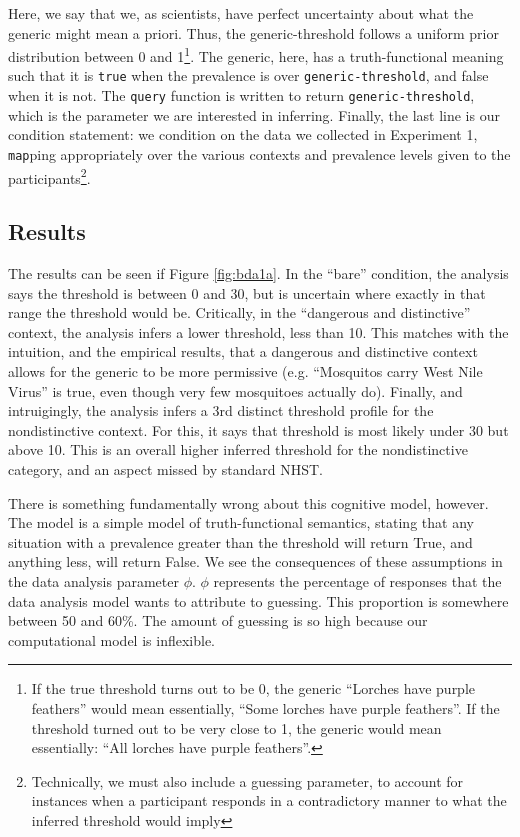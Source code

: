 \documentclass[10pt,letterpaper]{article}
\begin{document}
Here, we say that we, as scientists, have perfect uncertainty about what the generic might mean a priori. Thus, the generic-threshold follows a uniform prior distribution between 0 and 1\footnote{If the true threshold turns out to be 0, the generic ``Lorches have purple feathers'' would mean essentially, ``Some lorches have purple feathers''. If the threshold turned out to be very close to 1, the generic would mean essentially: ``All lorches have purple feathers''.}. The generic, here, has a truth-functional meaning such that it is \lstinline{true} when the prevalence is over \lstinline{generic-threshold}, and false when it is not. The \lstinline{query} function is written to return \lstinline{generic-threshold}, which is the parameter we are interested in inferring. Finally, the last line is our condition statement: we condition on the data we collected in Experiment 1, \lstinline{map}ping appropriately over the various contexts and prevalence levels given to the participants\footnote{Technically, we must also include a guessing parameter, to account for instances when a participant responds in a contradictory manner to what the inferred threshold would imply}. 

\subsection{Results}

The results can be seen if Figure \ref{fig:bda1a}. In the ``bare'' condition, the analysis says the threshold is between 0 and 30, but is uncertain where exactly in that range the threshold would be. Critically, in the ``dangerous and distinctive'' context, the analysis infers a lower threshold, less than 10. This matches with the intuition, and the empirical results, that a dangerous and distinctive context allows for the generic to be more permissive (e.g. ``Mosquitos carry West Nile Virus'' is true, even though very few mosquitoes actually do). Finally, and intruigingly, the analysis infers a 3rd distinct threshold profile for the nondistinctive context.  For this, it says that threshold is most likely under 30 but above 10. This is an overall higher inferred threshold for the nondistinctive category, and an aspect missed by standard NHST. 

There is something fundamentally wrong about this cognitive model, however. The model is a simple model of truth-functional semantics, stating that any situation with a prevalence greater than the threshold will return True, and anything less, will return False. We see the consequences of these assumptions in the data analysis parameter $\phi$. $\phi$ represents the percentage of responses that the data analysis model wants to attribute to guessing. This proportion is somewhere between 50 and 60\%. The amount of guessing is so high because our computational model is inflexible.
\end{document}
